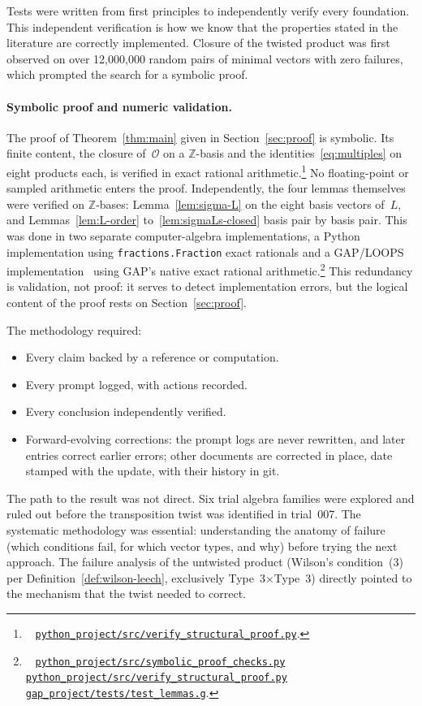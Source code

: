\documentclass[twoside,english]{paper}
\numberwithin{equation}{section}
\numberwithin{figure}{section}
\theoremstyle{definition}
\theoremstyle{remark}
\newcommand{\MO}{\mathcal{O}}         %
\newcommand{\ZZ}{\mathbb{Z}}
\newcommand{\scriptref}[1]{\cite{repo}~%
  \href{https://github.com/koeplinger/leech\_alg/blob/main/python\_project/src/#1}%
  {\nolinkurl{python_project/src/#1}}}
\newcommand{\gapref}[1]{\cite{repo}~%
  \href{https://github.com/koeplinger/leech\_alg/blob/main/gap\_project/#1}%
  {\nolinkurl{gap_project/#1}}}
\begin{document}
Tests were written from first principles to independently verify
every foundation.  This independent verification is how we know that the
properties stated in the literature are correctly implemented.
Closure of the twisted product was first observed on over
12{,}000{,}000 random pairs of minimal vectors with zero failures,
which prompted the search for a symbolic proof.

\paragraph{Symbolic proof and numeric validation.}
The proof of Theorem~\ref{thm:main} given in Section~\ref{sec:proof}
is symbolic.  Its finite content, the closure of~$\MO$ on a
$\ZZ$-basis and the identities~\eqref{eq:multiples} on eight products
each, is verified in exact rational
arithmetic.\footnote{\scriptref{verify\_structural\_proof.py}.}
No floating-point or sampled arithmetic enters the proof.
Independently, the four lemmas themselves were verified on
$\ZZ$-bases: Lemma~\ref{lem:sigma-L} on the eight basis vectors of~$L$,
and Lemmas~\ref{lem:L-order} to~\ref{lem:sigmaLs-closed} basis pair by
basis pair.  This was done in two separate computer-algebra
implementations, a Python implementation using
\texttt{fractions.Fraction} exact rationals and a GAP/LOOPS
implementation~\cite{GAP, LOOPS} using GAP's native exact rational
arithmetic.\footnote{\scriptref{symbolic\_proof\_checks.py}
\scriptref{verify\_structural\_proof.py} \gapref{tests/test\_lemmas.g}.}  This redundancy is validation, not
proof: it serves to detect implementation errors, but the logical
content of the proof rests on Section~\ref{sec:proof}.

The methodology required:
\begin{itemize}
\item Every claim backed by a reference or computation.
\item Every prompt logged, with actions recorded.
\item Every conclusion independently verified.
\item Forward-evolving corrections: the prompt logs are never rewritten,
  and later entries correct earlier errors; other documents are corrected
  in place, date stamped with the update, with their history in git.
\end{itemize}

The path to the result was not direct.  Six trial algebra families
were explored and ruled out before the transposition twist was
identified in trial~007.  The systematic methodology was essential:
understanding the anatomy of failure (which conditions fail, for
which vector types, and why) before trying the next approach.  The failure analysis of the untwisted product (Wilson's
condition~(3) per Definition~\ref{def:wilson-leech}, exclusively
Type~3$\times$Type~3) directly pointed to the
mechanism that the twist needed to correct.
\end{document}
